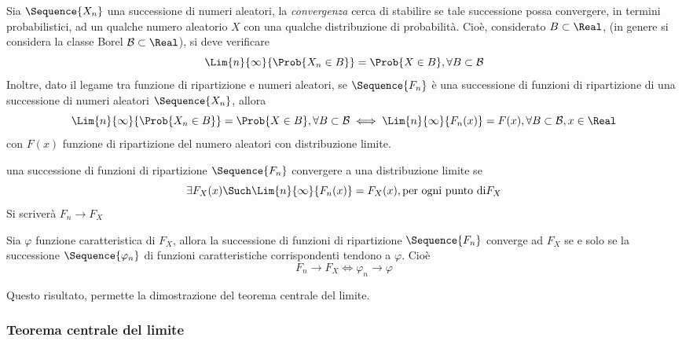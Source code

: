 \documentclass{subfiles}
\begin{document}
Sia $\Sequence{X_{n}}$ una successione di numeri aleatori,
la \emph{convergenza} cerca di stabilire se tale successione possa convergere, in termini probabilistici,
ad un qualche numero aleatorio $X$ con una qualche distribuzione di probabilità.
Cioè, considerato $B \subset \Real$, (in genere si considera la classe Borel $\mathcal{B} \subset \Real$), si deve verificare
$$
    \Lim{n}{\infty}{\Prob{X_{n} \in B}} = \Prob{X \in B}, \forall B \subset \mathcal{B}
$$
Inoltre, dato il legame tra funzione di ripartizione e numeri aleatori,
se $\Sequence{F_{n}}$ è una successione di funzioni di ripartizione di una successione di numeri aleatori $\Sequence{X_{n}}$, allora
$$
    \Lim{n}{\infty}{\Prob{X_{n} \in B}} = \Prob{X \in B}, \forall B \subset \mathcal{B}   \iff \Lim{n}{\infty}{F_{n}(x)} = F(x), \forall B \subset \mathcal{B}, x \in \Real
$$
con $F(x)$ funzione di ripartizione del numero aleatori con distribuzione limite.
\begin{Definition*}
    una successione di funzioni di ripartizione $\Sequence{F_{n}}$ convergere a una distribuzione limite se
    $$
        \exists F_{X}(x) \Such \Lim{n}{\infty}{F_{n}(x)} = F_{X}(x), \text{per ogni punto di} F_{X}
    $$
    Si scriverà $F_{n} \to F_{X}$
\end{Definition*}

\begin{Theorem*}
    Sia $\varphi$ funzione caratteristica di $F_{X}$, allora la successione di funzioni di ripartizione $\Sequence{F_{n}}$ converge ad $F_{X}$
    se e solo se la successione $\Sequence{\varphi_{n}}$ di funzioni caratteristiche corrispondenti tendono a $\varphi$. Cioè
    $$
        F_{n} \to F_{X} \iff \varphi_{n} \to \varphi
    $$
\end{Theorem*}
\begin{MarginNote}
    Questo risultato, permette la dimostrazione del teorema centrale del limite.
\end{MarginNote}
\clearpage

\subsubsection{Teorema centrale del limite}

\end{document}
